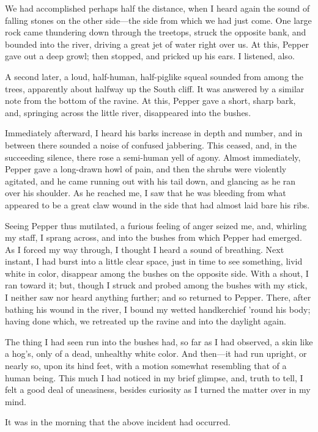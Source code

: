 We had accomplished perhaps half the distance, when I heard again the sound of falling stones on the other side---the side from which we had just come. One large rock came thundering down through the treetops, struck the opposite bank, and bounded into the river, driving a great jet of water right over us. At this, Pepper gave out a deep growl; then stopped, and pricked up his ears. I listened, also.

A second later, a loud, half-human, half-piglike squeal sounded from among the trees, apparently about halfway up the South cliff. It was answered by a similar note from the bottom of the ravine. At this, Pepper gave a short, sharp bark, and, springing across the little river, disappeared into the bushes.

Immediately afterward, I heard his barks increase in depth and number, and in between there sounded a noise of confused jabbering. This ceased, and, in the succeeding silence, there rose a semi-human yell of agony. Almost immediately, Pepper gave a long-drawn howl of pain, and then the shrubs were violently agitated, and he came running out with his tail down, and glancing as he ran over his shoulder. As he reached me, I saw that he was bleeding from what appeared to be a great claw wound in the side that had almost laid bare his ribs.

Seeing Pepper thus mutilated, a furious feeling of anger seized me, and, whirling my staff, I sprang across, and into the bushes from which Pepper had emerged. As I forced my way through, I thought I heard a sound of breathing. Next instant, I had burst into a little clear space, just in time to see something, livid white in color, disappear among the bushes on the opposite side. With a shout, I ran toward it; but, though I struck and probed among the bushes with my stick, I neither saw nor heard anything further; and so returned to Pepper. There, after bathing his wound in the river, I bound my wetted handkerchief ’round his body; having done which, we retreated up the ravine and into the daylight again.

The thing I had seen run into the bushes had, so far as I had observed, a skin like a hog’s, only of a dead, unhealthy white color. And then---it had run upright, or nearly so, upon its hind feet, with a motion somewhat resembling that of a human being. This much I had noticed in my brief glimpse, and, truth to tell, I felt a good deal of uneasiness, besides curiosity as I turned the matter over in my mind.

It was in the morning that the above incident had occurred.

